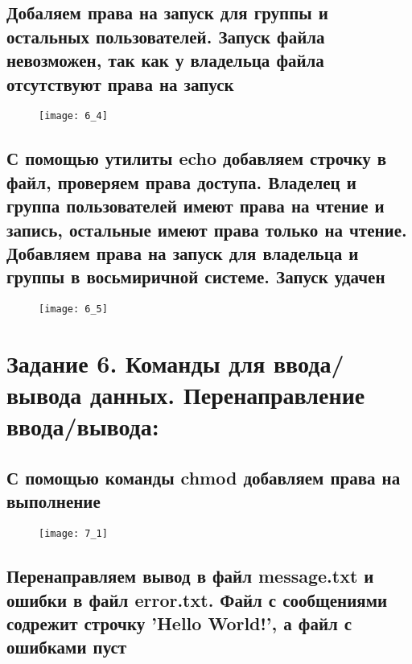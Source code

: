 \subsection{Добаляем права на запуск для группы и остальных пользователей. Запуск файла невозможен, так как у владельца файла отсутствуют права на запуск}

\begin{figure}[H]
	\begin{center}
		\texttt{[image: 6\_4]}
		\caption{} 
		\label{pic:pic_1} %
	\end{center}
\end{figure}

\subsection{С помощью утилиты echo добавляем строчку в файл, проверяем права доступа. Владелец и группа пользователей имеют права на чтение и запись, остальные имеют права только на чтение. Добавляем права на запуск для владельца и группы в восьмиричной системе. Запуск удачен}

\begin{figure}[H]
	\begin{center}
		\texttt{[image: 6\_5]}
		\caption{} 
		\label{pic:pic_1} %
	\end{center}
\end{figure}

\section{Задание 6. Команды для ввода/вывода данных. Перенаправление ввода/вывода:}

\subsection{С помощью команды chmod добавляем права на выполнение}

\begin{figure}[H]
	\begin{center}
		\texttt{[image: 7\_1]}
		\caption{} 
		\label{pic:pic_1} %
	\end{center}
\end{figure}

\subsection{Перенаправляем вывод в файл message.txt и ошибки в файл error.txt. Файл с сообщениями содрежит строчку 'Hello World!', а файл с ошибками пуст}

